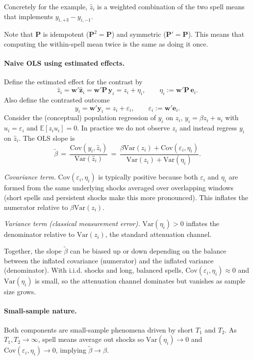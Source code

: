 \documentclass[11pt,a4paper]{article}
\newcommand{\Var}{\text{Var}}
\newcommand{\Cov}{\text{Cov}}
\begin{document}
Concretely for the example, $\hat z_i$ is a weighted combination of the two spell means that implements $y_{i,+3}-y_{i,-1}$.

Note that $\mathbf P$ is idempotent ($\mathbf P^2=\mathbf P$) and symmetric ($\mathbf P'=\mathbf P$). This means that computing the within-spell mean twice is the same as doing it once.


\paragraph{Naive OLS using estimated effects.} Define the estimated effect for the contrast by
\[
  \hat z_i = \mathbf w'\hat{\mathbf z}_i = \mathbf w'\mathbf P\,\mathbf y_i = z_i + \eta_i,\qquad \eta_i:=\mathbf w'\mathbf P\,\mathbf e_i.
\]
Also define the contrasted outcome
\[
  y_i = \mathbf w'\mathbf y_i = z_i + \varepsilon_i,\qquad \varepsilon_i:=\mathbf w'\mathbf e_i.
\]
Consider the (conceptual) population regression of $y_i$ on $z_i$, $y_i=\beta z_i+u_i$ with $u_i=\varepsilon_i$ and $\mathbb E[z_i u_i]=0$. In practice we do not observe $z_i$ and instead regress $y_i$ on $\hat z_i$. The OLS slope is
\[
  \tilde\beta \,=\, \frac{\Cov(y_i,\hat z_i)}{\Var(\hat z_i)} \,=\, \frac{\beta\Var(z_i)+\Cov(\varepsilon_i,\eta_i)}{\Var(z_i)+\Var(\eta_i)}.
\]
 
\textit{Covariance term.} $\Cov(\varepsilon_i,\eta_i)$ is typically positive because both $\varepsilon_i$ and $\eta_i$ are formed from the same underlying shocks averaged over overlapping windows (short spells and persistent shocks make this more pronounced). This inflates the numerator relative to $\beta\Var(z_i)$.

\textit{Variance term (classical measurement error).} $\Var(\eta_i)>0$ inflates the denominator relative to $\Var(z_i)$, the standard attenuation channel.

Together, the slope $\tilde\beta$ can be biased up or down depending on the balance between the inflated covariance (numerator) and the inflated variance (denominator). With i.i.d. shocks and long, balanced spells, $\Cov(\varepsilon_i,\eta_i)\approx 0$ and $\Var(\eta_i)$ is small, so the attenuation channel dominates but vanishes as sample size grows.

\paragraph{Small-sample nature.} Both components are small-sample phenomena driven by short $T_1$ and $T_2$. As $T_1,T_2\to\infty$, spell means average out shocks so $\Var(\eta_i)\to 0$ and $\Cov(\varepsilon_i,\eta_i)\to 0$, implying $\tilde\beta\to\beta$.
\end{document}

